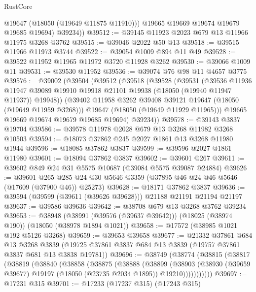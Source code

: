 \begin{lexlean}{RustCore}
\begin{coremodule}
            @19647
            (@18050 (@19649 @11875 @11910)))
          @19665
          @19669
          @19674
          @19679
          @19685
          @19694)
        @39234))
@39512 := @39145 @11923 @2023 @679 @13 @11966 @11975 @3268 @3762
@39515 := @39046 @2022 @50 @13
@39518 := @39515 @11966 @11973 @3744
@39522 := @39054 @1009 @894 @11 @49
@39528 := @39522 @11952 @11965 @11972 @3720 @11928 @3262
@39530 := @39066 @1009 @11
@39531 := @39530 @11952
@39536 := @39074 @76 @98 @11 @4657 @3775
@39576 := @39002
    (@39504
      (@39512
        (@39518
          (@39528
            (@39531
              (@39536
                @11936
                @11947
                @39089
                @19910
                @19918
                @21101
                @19938
                (@18050 (@19940 @11947 @11937))
                @19948))
            (@39402 @11958 @3262 @39408 @39121 @19647 (@18050 (@19649 @11959 @3268)))
            @19647
            (@18050 (@19649 @11929 @11965)))
          @19665
          @19669
          @19674
          @19679
          @19685
          @19694)
        @39234))
@39578 := @39143 @3837 @19704
@39586 := @39578 @11978 @2028 @679 @13 @3268 @11982 @3268 @10503
@39594 := @18073 @37862 @245 @2027 @1861 @13 @3268 @11980 @1944
@39596 := @18085 @37862 @3837
@39599 := @39596 @2027 @1861 @11980
@39601 := @18094 @37862 @3837
@39602 := @39601 @267
@39611 := @39602 @849 @24 @31 @5575 @10687 (@39084 @5575 @39087 @24884)
@39626 := @39601
    @265
    @285
    @24
    @30
    @5646
    @3359
    (@37895 @46 @24 @46 @5646 (@17609 (@37900 @46)) @25273)
@39628 := @18171 @37862 @3837
@39636 := @39594 (@39599 (@39611 (@39626 @39628))) @21188 @21191 @21194 @21197
@39637 := @39586 @39636
@39642 := @38708 @679 @13 @3268 @3762 @39234
@39653 := @38948
    (@38991 (@39576 (@39637 @39642)))
    (@18025 (@38974 @190))
    (@18050 (@38978 @1894 @1021))
@39658 := @17572 (@38985 @1021 @192 @5126 @3268)
@39659 := @39653 @39658
@39677 := @21332
    @37861
    @684
    @13
    @3268
    @3839
    (@19725 @37861 @3837 @684 @13 @3839 (@19757 @37861 @3837 @681 @13 @3838 @19781))
@39696 := @38749
    (@38774
      (@38815
        (@38817
          (@38819
            (@38840
              (@38858
                (@38875
                  (@38888
                    (@38899
                      (@38903
                        (@38930
                          (@39659 @39677)
                          @19197
                          (@18050 (@23735 @2034 @1895))
                          @19210)))))))))))
@39697 := @17231 @315
@39701 := @17233 (@17237 @315) (@17243 @315)

\end{coremodule}
\end{lexlean}
